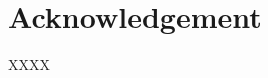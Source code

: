 \chapter*{Acknowledgement}
\begin{spacing}{2}
XXXX
\end{spacing}
\clearpage
\thispagestyle{empty}
\mbox{} 
\newpage
\setcounter{page}{6}